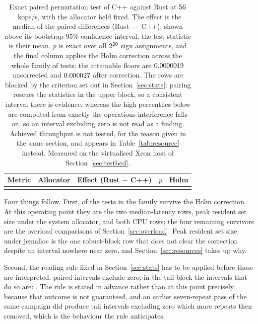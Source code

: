\documentclass[english,twoside,openright,a4paper,censored,csm,software-track-2020]{HYthesisML}
\begin{document}
\begin{table}
\centering
\small
\caption[Exact paired permutation test of C++ against Rust]{Exact paired permutation test of C++ against Rust at $56$~kops/s, with the
allocator held fixed. The effect is the median of the \NRepeats{} paired differences
(Rust~$-$~C++), shown above its bootstrap $95\%$ confidence interval; the test statistic is
their mean. $p$ is exact over all $2^{20}$ sign assignments, and the final column
applies the Holm correction across the whole family of \NTests{} tests; the attainable floors
are $0.0000019$ uncorrected and $0.000027$ after correction. The rows are blocked
by the criterion set out in Section~\ref{sec:stats}: pairing rescues the statistics in the
upper block, so a consistent interval there is evidence, whereas the high percentiles below are
computed from exactly the operations interference falls on, so an interval excluding zero is
not read as a finding. Achieved throughput is not tested, for the reason given in the same
section, and appears in Table~\ref{tab:resource} instead. Measured on the virtualised Xeon host
of Section~\ref{sec:testbed}.\label{tab:significance}}
\begin{tabular}{@{}l l r r r@{}}
\hline\hline
Metric & Allocator & Effect (Rust $-$ C++) & $p$ & Holm \\
\hline
\\
\hline
\end{tabular}
\end{table}

Four things follow. First, \NSignificant{} of the \NTests{} tests in the family survive the Holm
correction. At this operating point they are the two median-latency rows, peak resident set size
under the system allocator, and both CPU rows; the four remaining survivors are the overload
comparisons of Section~\ref{sec:overload}. Peak resident set size under jemalloc is the one
robust-block row that does not clear the correction despite an interval nowhere near zero, and
Section~\ref{sec:resources} takes up why.

Second, the reading rule fixed in Section~\ref{sec:stats} has to be applied before those are
interpreted. \NExclZero{} paired intervals exclude zero; in the tail block the intervals that do
so are: \TailExclZeroRows. The rule is stated in advance rather than at this point precisely
because that outcome is not guaranteed, and an earlier seven-repeat pass of the same campaign did
produce tail intervals excluding zero which more repeats then removed, which is the behaviour the
rule anticipates.
\end{document}
